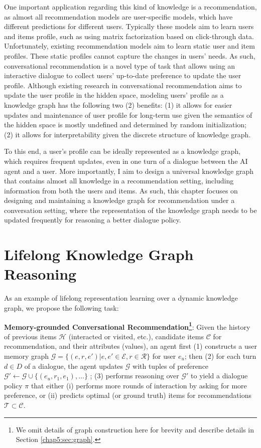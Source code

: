 One important application regarding this kind of knowledge is a recommendation, as almost all recommendation models are user-specific models, which have different predictions for different users.
Typically these models aim to learn users and items profile, such as using matrix factorization based on click-through data.
Unfortunately, existing recommendation models aim to learn static user and item profiles.
These static profiles cannot capture the changes in users' needs.
As such, conversational recommendation \cite{li2018towards,kang2019recommendation} is a novel type of task that allows using an interactive dialogue to collect users' up-to-date preference to update the user profile.
Although existing research in conversational recommendation aims to update the user profile in the hidden space, modeling users' profile as a knowledge graph has the following two (2) benefits: (1) it allows for easier updates and maintenance of user profile for long-term use given the semantics of the hidden space is mostly undefined and determined by random initialization; (2) it allows for interpretability given the discrete structure of knowledge graph.

To this end, a user's profile can be ideally represented as a knowledge graph, which requires frequent updates, even in one turn of a dialogue between the AI agent and a user.
More importantly, I aim to design a universal knowledge graph that contains almost all knowledge in a recommendation setting, including information from both the users and items.
As such, this chapter focuses on designing and maintaining a knowledge graph for recommendation under a conversation setting, where the representation of the knowledge graph needs to be updated frequently for reasoning a better dialogue policy.

\section{Lifelong Knowledge Graph Reasoning}
\label{chap5:sec:reason}

As an example of lifelong representation learning over a dynamic knowledge graph, we propose the following task:
 
\noindent\textbf{Memory-grounded Conversational Recommendation\footnote{We omit details of graph construction here for brevity and describe details in Section \ref{chap5:sec:graph}.}}:
Given the history of previous items $\mathcal{H}$ (interacted or visited, etc.), candidate items $\mathcal{C}$ for recommendation, and their attributes (values), 
an agent first (1) constructs a user memory graph $\mathcal{G} = \{(e, r, e')\vert e, e' \in \mathcal{E}, r \in \mathcal{R} \}$ for user $e_u$; 
then (2) for each turn $d \in D$ of a dialogue, the agent updates $\mathcal{G}$ with tuples of preference $\mathcal{G}' \gets \mathcal{G} \cup \{(e_u, r_1, e_1), \dots\}$ ;
(3) performs reasoning over $\mathcal{G}'$ to yield a dialogue policy $\pi$ that
either (i) performs more rounds of interaction by asking for more preference, 
or (ii) predicts optimal (or ground truth) items for recommendations $\mathcal{T} \subset \mathcal{C}$.

